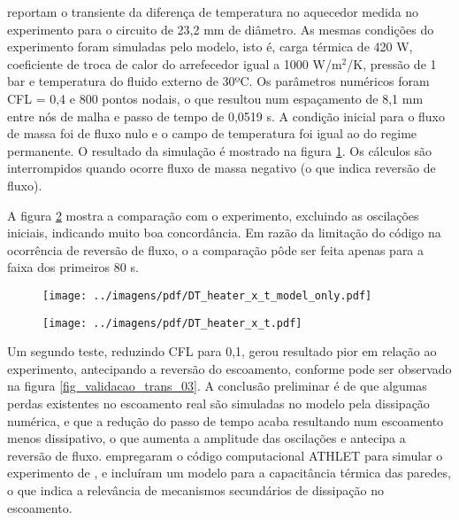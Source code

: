 \documentclass[a4paper,portuguese,10pt]{article}
\begin{document}
\citet{VIJAYAN94} reportam o transiente da diferença de temperatura no aquecedor medida no experimento para o circuito de 23,2 mm de diâmetro. As mesmas condições do experimento foram simuladas pelo modelo, isto é, carga térmica de 420 W, coeficiente de troca de calor do arrefecedor igual a 1000 W/m$^2$/K, pressão de 1 bar e temperatura do fluido externo de 30ºC. Os parâmetros numéricos foram CFL = 0,4 e 800 pontos nodais, o que resultou num espaçamento de 8,1 mm entre nós de malha e passo de tempo de 0,0519 s. A condição inicial para o fluxo de massa foi de fluxo nulo e o campo de temperatura foi igual ao do regime permanente. O resultado da simulação é mostrado na figura \ref{fig_validacao_trans_01}. Os cálculos são interrompidos quando ocorre fluxo de massa negativo (o que indica reversão de fluxo).

A figura \ref{fig_validacao_trans_02} mostra a comparação com o experimento, excluindo as oscilações iniciais, indicando muito boa concordância. Em razão da limitação do código na ocorrência de reversão de fluxo, o a comparação pôde ser feita apenas para a faixa dos primeiros 80 s.

\begin{figure}[t]
  \begin{center}
    \texttt{[image: ../imagens/pdf/DT\_heater\_x\_t\_model\_only.pdf]}
    \vspace*{-15mm}
    \label{fig_validacao_trans_01}
  \end{center}
\end{figure}

\begin{figure}[t]
  \begin{center}
    \texttt{[image: ../imagens/pdf/DT\_heater\_x\_t.pdf]}
    \vspace*{-15mm}
    \label{fig_validacao_trans_02}
  \end{center}
\end{figure}

Um segundo teste, reduzindo CFL para 0,1, gerou resultado pior em relação ao experimento, antecipando a reversão do escoamento, conforme pode ser observado na figura \ref{fig_validacao_trans_03}. A conclusão preliminar é de que algumas perdas existentes no escoamento real são simuladas no modelo pela dissipação numérica, e que a redução do passo de tempo acaba resultando num escoamento menos dissipativo, o que aumenta a amplitude das oscilações e antecipa a reversão de fluxo. \citet{VIJAYAN95} empregaram o código computacional ATHLET para simular o experimento de \citet{VIJAYAN94}, e incluíram um modelo para a capacitância térmica das paredes, o que indica a relevância de mecanismos secundários de dissipação no escoamento.
\end{document}
